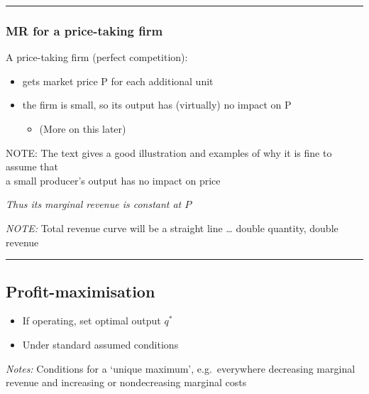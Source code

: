 \documentclass[]{article}
\providecommand{\tightlist}{%
  \setlength{\itemsep}{0pt}\setlength{\parskip}{0pt}}
\begin{document}
\begin{center}\rule{0.5\linewidth}{\linethickness}\end{center}

\hypertarget{mr-for-a-price-taking-firm}{%
\subsubsection{MR for a price-taking firm}\label{mr-for-a-price-taking-firm}}

A price-taking firm (perfect competition):

\begin{itemize}
\tightlist
\item
  gets market price P for each additional unit
\item
  the firm is small, so its output has (virtually) no impact on P

  \begin{itemize}
  \tightlist
  \item
    (More on this later)
  \end{itemize}
\end{itemize}

NOTE: The text gives a good illustration and examples of why it is fine to assume that\\
a small producer's output has no impact on price

\bigskip

\emph{Thus its marginal revenue is constant at \(P\)}

\emph{NOTE:} Total revenue curve will be a straight line \ldots{} double quantity, double revenue

\begin{center}\rule{0.5\linewidth}{\linethickness}\end{center}

\hypertarget{profit-maximisation}{%
\subsection{Profit-maximisation}\label{profit-maximisation}}

\begin{itemize}
\tightlist
\item
  If operating, set optimal output \(q^*\)
\item
  Under standard assumed conditions
\end{itemize}

\emph{Notes:}
Conditions for a `unique maximum', e.g.~everywhere decreasing marginal revenue and increasing or nondecreasing marginal costs
\end{document}

